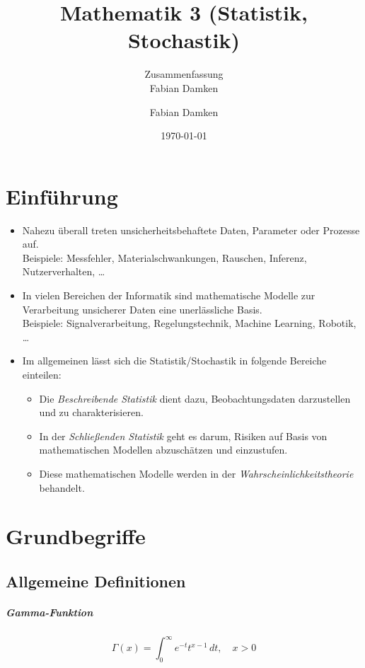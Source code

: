 \documentclass[a4paper, 11pt, accentcolor = tud3b]{tudreport}
\title{Mathematik 3 (Statistik, Stochastik)}
\subtitle{Zusammenfassung \\ Fabian Damken}
\author{Fabian Damken}
\date{\today}
\begin{document}
    \maketitle
    \tableofcontents
    \listoftodos

    \chapter{Einführung}
        \begin{itemize}
        	\item Nahezu überall treten unsicherheitsbehaftete Daten, Parameter oder Prozesse auf. \\ Beispiele: Messfehler, Materialschwankungen, Rauschen, Inferenz, Nutzerverhalten, \dots
        	\item In vielen Bereichen der Informatik sind mathematische Modelle zur Verarbeitung unsicherer Daten eine unerlässliche Basis. \\ Beispiele: Signalverarbeitung, Regelungstechnik, Machine Learning, Robotik, \dots
        	\item Im allgemeinen lässt sich die Statistik/Stochastik in folgende Bereiche einteilen:
	        	\begin{itemize}
	        		\item Die \textit{Beschreibende Statistik} dient dazu, Beobachtungsdaten darzustellen und zu charakterisieren.
	        		\item In der \textit{Schließenden Statistik} geht es darum, Risiken auf Basis von mathematischen Modellen abzuschätzen und einzustufen.
	        		\item Diese mathematischen Modelle werden in der \textit{Wahrscheinlichkeitstheorie} behandelt.
	        	\end{itemize}
        \end{itemize}

    \chapter{Grundbegriffe}
	    \section{Allgemeine Definitionen}
		    \paragraph{Gamma-Funktion}
			    \begin{equation*}
				    \Gamma(x) = \int_{0}^{\infty} \! e^{-t} t^{x - 1} \, dt, \quad x > 0
			    \end{equation*}
		    
\end{document}
